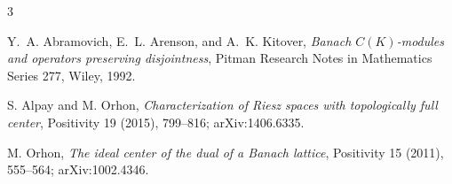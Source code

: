 \documentclass[11pt]{amsart}
\begin{document}
\begin{thebibliography}{3}

Y.~A. Abramovich, E.~L. Arenson, and A.~K. Kitover,
\emph{Banach $C(K)$-modules and operators preserving disjointness},
Pitman Research Notes in Mathematics Series 277, Wiley, 1992.

S. Alpay and M. Orhon,
\emph{Characterization of Riesz spaces with topologically full center},
Positivity 19 (2015), 799--816; arXiv:1406.6335.

M. Orhon,
\emph{The ideal center of the dual of a Banach lattice},
Positivity 15 (2011), 555--564; arXiv:1002.4346.

\end{thebibliography}
\end{document}
